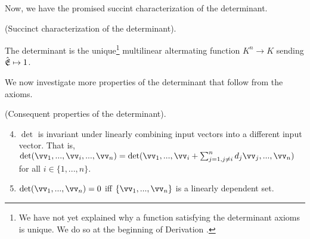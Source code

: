 Now, we have the promised succint characterization of the determinant.

\begin{theorem}
    (Succinct characterization of the determinant).

    The determinant is the unique\footnote{We have not yet explained why a function satisfying the determinant axioms is unique. We do so at the beginning of Derivation \label{ch::exterior_powers::deriv::permutation_formula_for_determinant}.} multilinear altermating function $K^n \rightarrow K$ sending ${\hat{\mathfrak{E}}} \mapsto 1$.
\end{theorem}

We now investigate more properties of the determinant that follow from the axioms.

\begin{theorem}
\label{ch::lin_alg::thm::consequent_det_props}
    (Consequent properties of the determinant). 
    
    \begin{enumerate}
    \setcounter{enumi}{3}
        \item $\det$ is invariant under linearly combining input vectors into a different input vector. That is, $\det(\vv_1, ..., \vv_i, ..., \vv_n) = \det(\vv_1, ..., \vv_i + \sum_{j = 1, j \neq i}^n d_j \vv_j, ..., \vv_n)$ for all $i \in \{1, ..., n\}$.
        \item $\det(\vv_1, ..., \vv_n) = 0$ iff $\{\vv_1, ..., \vv_n\}$ is a linearly dependent set.
    \end{enumerate}
\end{theorem}

